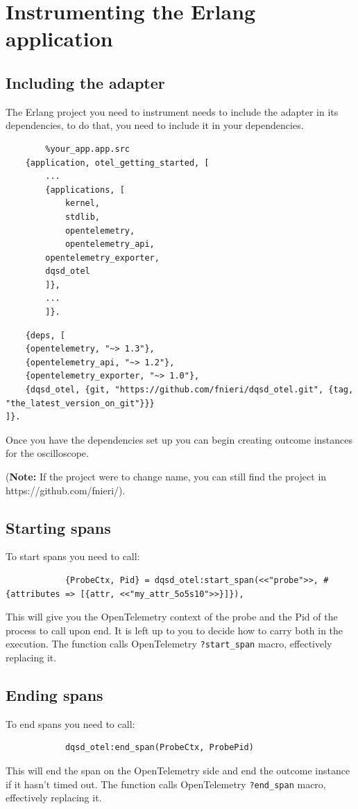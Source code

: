 \section{Instrumenting the Erlang application}
    \subsection{Including the adapter}

    The Erlang project you need to instrument needs to include the adapter in its dependencies, to do that, you need to include it in your dependencies.

    \begin{verbatim}
        %your_app.app.src
    {application, otel_getting_started, [
        ...
        {applications, [
            kernel,
            stdlib,
            opentelemetry,
            opentelemetry_api,
        opentelemetry_exporter,
        dqsd_otel
        ]},
        ...
        ]}.
    \end{verbatim}

    \begin{verbatim}
    {deps, [
    {opentelemetry, "~> 1.3"},
    {opentelemetry_api, "~> 1.2"},
    {opentelemetry_exporter, "~> 1.0"},
    {dqsd_otel, {git, "https://github.com/fnieri/dqsd_otel.git", {tag, "the_latest_version_on_git"}}}
]}.
    \end{verbatim}
    
    Once you have the dependencies set up you can begin creating outcome instances for the oscilloscope.

    (\textbf{Note:} If the project were to change name, you can still find the project in https://github.com/fnieri/).

    \subsection{Starting spans}
        To start spans you need to call:
        \begin{verbatim}
            {ProbeCtx, Pid} = dqsd_otel:start_span(<<"probe">>, #{attributes => [{attr, <<"my_attr_5o5s10">>}]}),
        \end{verbatim}
        This will give you the OpenTelemetry context of the probe and the Pid of the process to call upon end. It is left up to you to decide how to carry both in the execution.
        The function calls OpenTelemetry \texttt{?start\_span} macro, effectively replacing it.

    \subsection{Ending spans}
        To end spans you need to call:
        \begin{verbatim}
            dqsd_otel:end_span(ProbeCtx, ProbePid)
        \end{verbatim}
        This will end the span on the OpenTelemetry side and end the outcome instance if it hasn't timed out.
        The function calls OpenTelemetry \texttt{?end\_span} macro, effectively replacing it.

